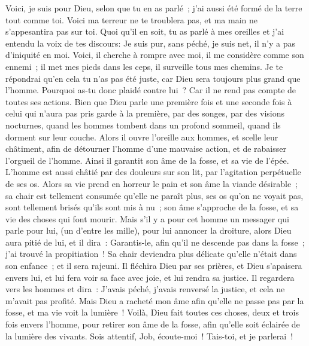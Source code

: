 \begin{multicols}{2}
Voici, je suis pour Dieu, selon que tu en as parlé~; j'ai aussi été formé de la terre tout comme toi.
Voici ma terreur ne te troublera pas, et ma main ne s'appesantira pas sur toi.
Quoi qu'il en soit, tu as parlé à mes oreilles et j'ai entendu la voix de tes discours:
Je suis pur, sans péché, je suis net, il n'y a pas d'iniquité en moi.
Voici, il cherche à rompre avec moi, il me considère comme son ennemi~;
il met mes pieds dans les ceps, il surveille tous mes chemins.
Je te répondrai qu'en cela tu n'as pas été juste, car Dieu sera toujours plus grand que l'homme.
Pourquoi as-tu donc plaidé contre lui~? Car il ne rend pas compte de toutes ses actions.
Bien que Dieu parle une première fois et une seconde fois à celui qui n'aura pas pris garde à la première,
par des songes, par des visions nocturnes, quand les hommes tombent dans un profond sommeil, quand ils dorment sur leur couche.
Alors il ouvre l'oreille aux hommes, et scelle leur châtiment,
afin de détourner l'homme d'une mauvaise action, et de rabaisser l'orgueil de l'homme.
Ainsi il garantit son âme de la fosse, et sa vie de l'épée.
L'homme est aussi châtié par des douleurs sur son lit, par l'agitation perpétuelle de ses os.
Alors sa vie prend en horreur le pain et son âme la viande désirable~;
sa chair est tellement consumée qu'elle ne paraît plus, ses os qu'on ne voyait pas, sont tellement brisés qu'ils sont mis à nu~;
son âme s'approche de la fosse, et sa vie des choses qui font mourir.
Mais s'il y a pour cet homme un messager qui parle pour lui, (un d'entre les mille), pour lui annoncer la droiture,
alors Dieu aura pitié de lui, et il dira~: Garantis-le, afin qu'il ne descende pas dans la fosse~; j'ai trouvé la propitiation~!
Sa chair deviendra plus délicate qu'elle n'était dans son enfance~; et il sera rajeuni.
Il fléchira Dieu par ses prières, et Dieu s'apaisera envers lui, et lui fera voir sa face avec joie, et lui rendra sa justice.
Il regardera vers les hommes et dira~: J'avais péché, j'avais renversé la justice, et cela ne m'avait pas profité.
Mais Dieu a racheté mon âme afin qu'elle ne passe pas par la fosse, et ma vie voit la lumière~!
Voilà, Dieu fait toutes ces choses, deux et trois fois envers l'homme,
pour retirer son âme de la fosse, afin qu'elle soit éclairée de la lumière des vivants.
Sois attentif, Job, écoute-moi~! Tais-toi, et je parlerai~!

\end{multicols}
